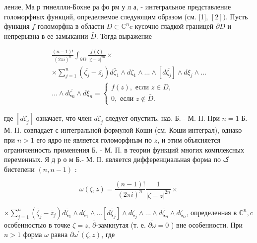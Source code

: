 \documentclass[10pt]{article}
\begin{document}
ление, Ма р тинеллли-Бохне ра фо рм у л а, - интегральное представление голоморфных функций, определяемое следующим образом (см. [1], $[2])$. Пусть функция $f$ голоморфна в области $D \subset \mathbb{C}^{n} \mathrm{c}$ кусочно гладкой границей $\partial D$ и непрерывна в ее замыкании $\bar{D}$. Тогда выражение



\[

\begin{gathered}

\frac{(n-1) !}{(2 \pi i)^{n}} \int_{\partial D} \frac{f(\zeta)}{|\zeta-z|^{2 n}} \times \\

\times \sum_{j=1}^{n}\left(\overline{\zeta_{j}}-\overline{z_{j}}\right) d \bar{\zeta}_{1} \wedge d \zeta_{1} \wedge \ldots \wedge\left[d \overline{\zeta_{j}}\right] \wedge d \xi_{j} \wedge \ldots \\

\ldots \wedge d \overline{\zeta_{n}} \wedge d \xi_{n}=\left\{\begin{array}{c}

f(z), \text { если } z \in D, \\

0, \text { если } z \notin \bar{D} .

\end{array}\right.

\end{gathered}

\]



где $\left[d \overline{\zeta_{j}}\right]$ означает, что член $d \bar{\zeta}_{j}$ следует опустить, наз. Б. - М. П. При $n=1$ Б.-М. П. совпадает с интегральной формулой Коши (см. Коши интеграл), однако при $n>1$ его ядро не является голоморфным по $z$, и этим объясняется ограниченность применения Б. - М. П. в теории функций многих комплексных переменных. Я д р о м Б.- М. ІІ. является дифференциальная форма по ک бистепени $(n, n-1)$ :



\[

\omega(\zeta, z)=\frac{(n-1) !}{(2 \pi i)^{n}} \frac{1}{|\zeta-z|^{2 n}} \times

\]



$\times \sum_{j=1}^{n}\left(\bar{\zeta}_{j}-\bar{z}_{j}\right) d \bar{\zeta}_{1} \wedge d \zeta_{1} \wedge \ldots\left[d \bar{\zeta}_{j}\right] \wedge d \zeta_{j} \wedge \ldots \wedge d \bar{\zeta}_{n} \wedge d \zeta_{n}$, определенная в $\mathbb{C}^{n}, \mathrm{c}$ особенностью в точке $\zeta=z$, $\bar{\partial}$-замкнутая (т. е. $\overline{\partial \omega}=0$ ) вне особенности. При $n>1$ форма $\omega$ равна $\partial \omega^{\prime}(\zeta, z)$, где
\end{document}

